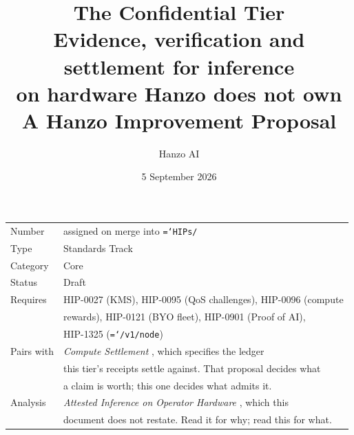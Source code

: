 \documentclass[11pt,a4paper]{article}
\title{\textbf{The Confidential Tier}\\[6pt]
\large Evidence, verification and settlement for inference\\
on hardware Hanzo does not own\\[4pt]
\normalsize A Hanzo Improvement Proposal}
\author{Hanzo AI}
\date{5 September 2026}
\newcommand{\code}[1]{\texttt{\hyphenchar\font=`\-\relax #1}}
\begin{document}
\maketitle

\begin{center}
\begin{tabular}{@{}ll@{}}
\toprule
Number      & assigned on merge into \code{HIPs/} \\
Type        & Standards Track \\
Category    & Core \\
Status      & Draft \\
Requires    & HIP-0027 (KMS), HIP-0095 (QoS challenges), HIP-0096 (compute\\
            & rewards), HIP-0121 (BYO fleet), HIP-0901 (Proof of AI),\\
            & HIP-1325 (\code{/v1/node}) \\
Pairs with  & \emph{Compute Settlement} \cite{hipsettle}, which specifies the ledger\\
            & this tier's receipts settle against. That proposal decides what\\
            & a claim is worth; this one decides what admits it. \\
Analysis    & \emph{Attested Inference on Operator Hardware} \cite{paper}, which this\\
            & document does not restate. Read it for why; read this for what. \\
\bottomrule
\end{tabular}
\end{center}
\end{document}
